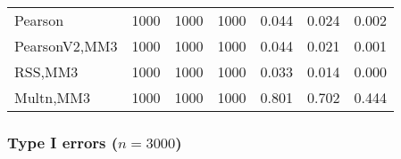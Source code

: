 \documentclass[
]{article}
\begin{document}
\begin{table}[H]
{\begin{tabular}[t]{lrrrrrr}
\hspace{1em}Pearson & 1000 & 1000 & 1000 & 0.044 & 0.024 & 0.002\\
\hspace{1em}PearsonV2,MM3 & 1000 & 1000 & 1000 & 0.044 & 0.021 & 0.001\\
\hspace{1em}RSS,MM3 & 1000 & 1000 & 1000 & 0.033 & 0.014 & 0.000\\
\hspace{1em}Multn,MM3 & 1000 & 1000 & 1000 & 0.801 & 0.702 & 0.444\\
\bottomrule
\end{tabular}}
\end{table}

\hypertarget{type-i-errors-n3000-3}{%
\subsubsection{\texorpdfstring{Type I errors
(\(n=3000\))}{Type I errors (n=3000)}}\label{type-i-errors-n3000-3}}
\end{document}
